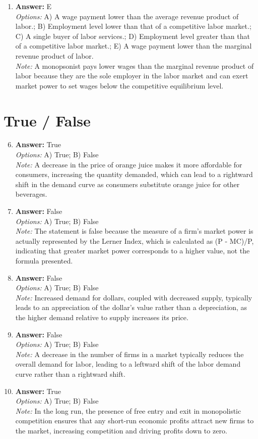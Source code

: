 \documentclass[12pt]{article}
\begin{document}
\begin{enumerate}[label=\arabic*.]
\item \textbf{Answer:} E
\\ \textit{Options:} A) A wage payment lower than the average revenue product of labor.; B) Employment level lower than that of a competitive labor market.; C) A single buyer of labor services.; D) Employment level greater than that of a competitive labor market.; E) A wage payment lower than the marginal revenue product of labor.
\\ \textit{Note:} A monopsonist pays lower wages than the marginal revenue product of labor because they are the sole employer in the labor market and can exert market power to set wages below the competitive equilibrium level.
\end{enumerate}

\section*{True / False}
\begin{enumerate}[label=\arabic*.]
\setcounter{enumi}{5}
\item \textbf{Answer:} True
\\ \textit{Options:} A) True; B) False
\\ \textit{Note:} A decrease in the price of orange juice makes it more affordable for consumers, increasing the quantity demanded, which can lead to a rightward shift in the demand curve as consumers substitute orange juice for other beverages.
\item \textbf{Answer:} False
\\ \textit{Options:} A) True; B) False
\\ \textit{Note:} The statement is false because the measure of a firm's market power is actually represented by the Lerner Index, which is calculated as (P - MC)/P, indicating that greater market power corresponds to a higher value, not the formula presented.
\item \textbf{Answer:} False
\\ \textit{Options:} A) True; B) False
\\ \textit{Note:} Increased demand for dollars, coupled with decreased supply, typically leads to an appreciation of the dollar's value rather than a depreciation, as the higher demand relative to supply increases its price.
\item \textbf{Answer:} False
\\ \textit{Options:} A) True; B) False
\\ \textit{Note:} A decrease in the number of firms in a market typically reduces the overall demand for labor, leading to a leftward shift of the labor demand curve rather than a rightward shift.
\item \textbf{Answer:} True
\\ \textit{Options:} A) True; B) False
\\ \textit{Note:} In the long run, the presence of free entry and exit in monopolistic competition ensures that any short-run economic profits attract new firms to the market, increasing competition and driving profits down to zero.
\end{enumerate}
\end{document}
